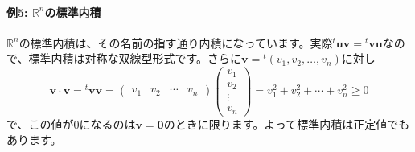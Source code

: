 \paragraph{例5: $\mathbb{R}^n$の標準内積}

$\mathbb{R}^n$の標準内積は、その名前の指す通り内積になっています。実際${}^t\bm{u}\bm{v} = {}^t\bm{v}\bm{u}$なので、標準内積は対称な双線型形式です。さらに$\bm{v} = {}^t(v_1, v_2, \ldots, v_n)$に対し
\[
\bm{v} \cdot \bm{v} = 
{}^t\bm{v} \bm{v} = 
\begin{pmatrix}
v_1 & v_2 & \cdots & v_n
\end{pmatrix}
\begin{pmatrix}
v_1 \\
v_2 \\
\vdots \\
v_n
\end{pmatrix}
= v_1^2 + v_2^2 + \cdots + v_n^2 \geq 0
\]
で、この値が$0$になるのは$\bm{v} = \bm{0}$のときに限ります。よって標準内積は正定値でもあります。


